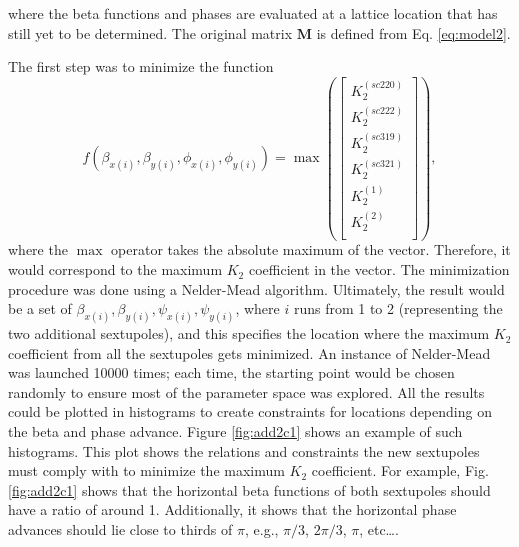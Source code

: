 where the beta functions and phases are evaluated at a lattice location that has still yet to be determined. The original matrix $\boldsymbol{M}$ is defined from Eq. \ref{eq:model2}. 

The first step was to minimize the function
\begin{equation}
    \label{eq:fmax}
    f\left(\beta_{x(i)},\beta_{y(i)}, \phi_{x(i)}, \phi_{y(i)}\right) = \max \left(
    \begin{bmatrix}
    K_2^{(sc220)} \\
    K_2^{(sc222)}\\
    K_2^{(sc319)} \\
    K_2^{(sc321)}\\
    K_2^{(1)} \\
    K_2^{(2)}\\
    \end{bmatrix}
\right),
\end{equation}
where the $\max$ operator takes the absolute maximum of the vector. Therefore, it would correspond to the maximum $K_2$ coefficient in the vector. The minimization procedure was done using a Nelder-Mead algorithm. Ultimately, the result would be a set of $\beta_{x(i)},\beta_{y(i)}, \psi_{x(i)}, \psi_{y(i)}$, where $i$ runs from 1 to 2 (representing the two additional sextupoles), and this specifies the location where the maximum $K_2$ coefficient from all the sextupoles gets minimized. An instance of Nelder-Mead was launched 10000 times; each time, the starting point would be chosen randomly to ensure most of the parameter space was explored. All the results could be plotted in histograms to create constraints for locations depending on the beta and phase advance. Figure \ref{fig:add2c1} shows an example of such histograms. This plot shows the relations and constraints the new sextupoles must comply with to minimize the maximum $K_2$ coefficient. For example, Fig. \ref{fig:add2c1} shows that the horizontal beta functions of both sextupoles should have a ratio of around 1. Additionally, it shows that the horizontal phase advances should lie close to thirds of $\pi$, e.g., $\pi/3$, $2\pi/3$, $\pi$, etc\dots.

